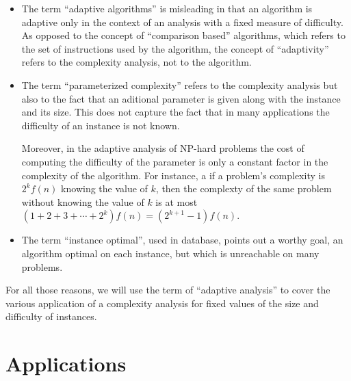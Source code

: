 \begin{itemize}
\item The term ``adaptive algorithms'' is misleading in that an
  algorithm is adaptive only in the context of an analysis with a
  fixed measure of difficulty.
  As opposed to the concept of ``comparison based'' algorithms, which
  refers to the set of instructions used by the algorithm, the concept
  of ``adaptivity'' refers to the complexity analysis, not to the
  algorithm.

\item The term ``parameterized complexity'' refers to the complexity
  analysis but also to the fact that an aditional parameter is given
  along with the instance and its size. 
  This does not capture the fact that in many applications the
  difficulty of an instance is not known.

  Moreover, in the adaptive analysis of NP-hard problems the cost of
  computing the difficulty of the parameter is only a constant factor
  in the complexity of the algorithm.
  For instance, a if a problem's complexity is $2^{k}f(n)$ knowing the
  value of $k$, then the complexty of the same problem without knowing
  the value of $k$ is at most
  $(1+2+3+\cdots+2^k)f(n)=(2^{k+1}-1)f(n)$.

\item The term ``instance optimal'', used in database, points out a
  worthy goal, an algorithm optimal on each instance, but which is
  unreachable on many problems.

\end{itemize}

For all those reasons, we will use the term of ``adaptive analysis''
to cover the various application of a complexity analysis for fixed
values of the size and difficulty of instances.


\section{Applications}
\label{sec:applications}


